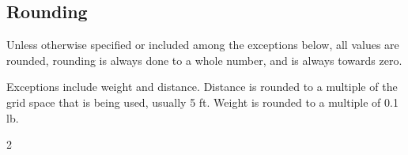 \begin{multicols*}{2}
    \subsection{Rounding}
    Unless otherwise specified or included among the exceptions below, all
    values are rounded, rounding is always done to a whole number, and is
    always towards zero.

    Exceptions include weight and distance. Distance is rounded to a multiple
    of the grid space that is being used, usually 5 ft. Weight is rounded to
    a multiple of 0.1 lb.
\end{multicols*}{2}
